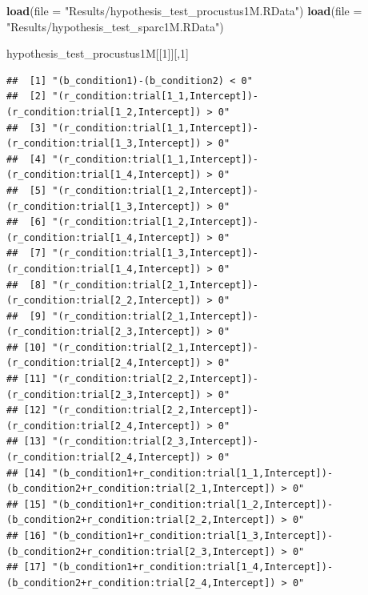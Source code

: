 \documentclass[
]{article}
\newenvironment{Shaded}{\begin{snugshade}}{\end{snugshade}}
\newcommand{\AttributeTok}[1]{\textcolor[rgb]{0.13,0.29,0.53}{#1}}
\newcommand{\DecValTok}[1]{\textcolor[rgb]{0.00,0.00,0.81}{#1}}
\newcommand{\FunctionTok}[1]{\textcolor[rgb]{0.13,0.29,0.53}{\textbf{#1}}}
\newcommand{\NormalTok}[1]{#1}
\newcommand{\StringTok}[1]{\textcolor[rgb]{0.31,0.60,0.02}{#1}}
\begin{document}
\begin{Shaded}
\begin{Highlighting}[]
\FunctionTok{load}\NormalTok{(}\AttributeTok{file =} \StringTok{"Results/hypothesis\_test\_procustus1M.RData"}\NormalTok{)}
\FunctionTok{load}\NormalTok{(}\AttributeTok{file =} \StringTok{"Results/hypothesis\_test\_sparc1M.RData"}\NormalTok{)}

\NormalTok{hypothesis\_test\_procustus1M[[}\DecValTok{1}\NormalTok{]][,}\DecValTok{1}\NormalTok{]}
\end{Highlighting}
\end{Shaded}

\begin{verbatim}
##  [1] "(b_condition1)-(b_condition2) < 0"                                                                  
##  [2] "(r_condition:trial[1_1,Intercept])-(r_condition:trial[1_2,Intercept]) > 0"                          
##  [3] "(r_condition:trial[1_1,Intercept])-(r_condition:trial[1_3,Intercept]) > 0"                          
##  [4] "(r_condition:trial[1_1,Intercept])-(r_condition:trial[1_4,Intercept]) > 0"                          
##  [5] "(r_condition:trial[1_2,Intercept])-(r_condition:trial[1_3,Intercept]) > 0"                          
##  [6] "(r_condition:trial[1_2,Intercept])-(r_condition:trial[1_4,Intercept]) > 0"                          
##  [7] "(r_condition:trial[1_3,Intercept])-(r_condition:trial[1_4,Intercept]) > 0"                          
##  [8] "(r_condition:trial[2_1,Intercept])-(r_condition:trial[2_2,Intercept]) > 0"                          
##  [9] "(r_condition:trial[2_1,Intercept])-(r_condition:trial[2_3,Intercept]) > 0"                          
## [10] "(r_condition:trial[2_1,Intercept])-(r_condition:trial[2_4,Intercept]) > 0"                          
## [11] "(r_condition:trial[2_2,Intercept])-(r_condition:trial[2_3,Intercept]) > 0"                          
## [12] "(r_condition:trial[2_2,Intercept])-(r_condition:trial[2_4,Intercept]) > 0"                          
## [13] "(r_condition:trial[2_3,Intercept])-(r_condition:trial[2_4,Intercept]) > 0"                          
## [14] "(b_condition1+r_condition:trial[1_1,Intercept])-(b_condition2+r_condition:trial[2_1,Intercept]) > 0"
## [15] "(b_condition1+r_condition:trial[1_2,Intercept])-(b_condition2+r_condition:trial[2_2,Intercept]) > 0"
## [16] "(b_condition1+r_condition:trial[1_3,Intercept])-(b_condition2+r_condition:trial[2_3,Intercept]) > 0"
## [17] "(b_condition1+r_condition:trial[1_4,Intercept])-(b_condition2+r_condition:trial[2_4,Intercept]) > 0"
\end{verbatim}
\end{document}

